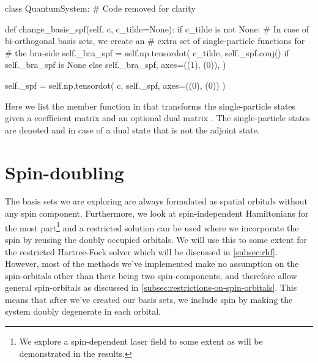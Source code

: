         \begin{algorithm}
            \begin{python}
class QuantumSystem:
    # Code removed for clarity

    def change_basis_spf(self, c, c_tilde=None):
        if c_tilde is not None:
            # In case of bi-orthogonal basis sets, we create an
            # extra set of single-particle functions for
            # the bra-side
            self._bra_spf = self.np.tensordot(
                c_tilde,
                self._spf.conj()
                if self._bra_spf is None else self._bra_spf,
                axes=((1), (0)),
            )

        self._spf = self.np.tensordot(
            c, self._spf, axes=((0), (0))
        )
            \end{python}
            \caption{Here we list the member function in 
            that transforms the single-particle states given a coefficient
            matrix  and an optional dual matrix .
            The single-particle states are denoted  and
             in case of a dual state that is not the adjoint
            state.}
            \label{alg:transform-spfs}
        \end{algorithm}


    \section{Spin-doubling}
        The basis sets we are exploring are always formulated as spatial
        orbitals without any spin component.
        Furthermore, we look at spin-independent Hamiltonians for the most
        part\footnote{%
            We explore a spin-dependent laser field to some extent as will be
            demonstrated in the results.
        } and a restricted solution can be used where we incorporate the spin by
        reusing the doubly occupied orbitals.
        We will use this to some extent for the restricted Hartree-Fock solver
        which will be discussed in \autoref{subsec:rhf}.
        However, most of the methods we've implemented make no assumption on the
        spin-orbitals other than there being two spin-components, and therefore
        allow general spin-orbitals as discussed in
        \autoref{subsec:restrictions-on-spin-orbitals}.
        This means that after we've created our basis sets, we include spin by
        making the system doubly degenerate in each orbital.


